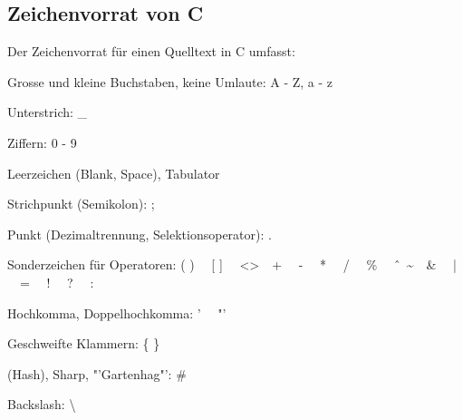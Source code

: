  	\subsection{Zeichenvorrat von C}
 		Der Zeichenvorrat für einen Quelltext in C umfasst: \\
 		\begin{minipage}[c]{9 cm}
 			\begin{compactitem}
 				\item Grosse und kleine Buchstaben, keine Umlaute: A - Z, a - z 
 				\item Unterstrich: \_
 				\item Ziffern: 0 - 9
 				\item Leerzeichen (Blank, Space), Tabulator
 				\item Strichpunkt (Semikolon): ;	
 			\end{compactitem}  				
 		\end{minipage}
 		\hspace*{0.5cm}
 		\begin{minipage}[c]{9 cm}
			\begin{compactitem}
 				\item Punkt (Dezimaltrennung, Selektionsoperator): .
 				\item Sonderzeichen für Operatoren: ( ) \ \ [ ] \ \ \textless  	\textgreater \ \  + \ \ - \ \ * \ \ / \ \ \% \ \ \^ \ \ \textasciitilde \ \ \& \ \ | \ \ = \ \ ! \ \ ? \ \ :
 				\item Hochkomma, Doppelhochkomma: ' \ \ "'
 				\item Geschweifte Klammern: \{ \}
 				\item (Hash), Sharp, "'Gartenhag"': \#
 				\item Backslash: \textbackslash 	
 			\end{compactitem} 
 		\end{minipage}

